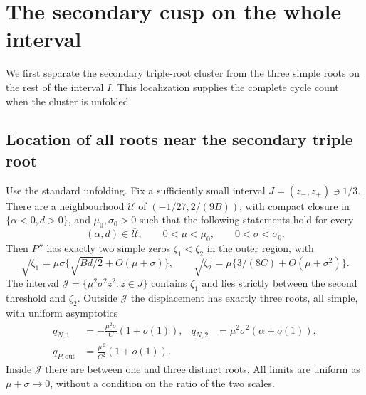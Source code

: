 \section{The secondary cusp on the whole interval}\label{sup:cusp}

We first separate the secondary triple-root cluster from the three simple
roots on the rest of the interval $I$. This localization supplies the
complete cycle count when the cluster is unfolded.

\subsection{Location of all roots near the secondary triple root}

\begin{lemma}
\label{corner:all-roots}
Use the standard unfolding.
Fix a sufficiently small interval $J=(z_-,z_+)\ni1/3$.
There are a neighbourhood $\mathcal U$ of
$(-1/27,2/(9B))$, with compact closure in $\{\alpha<0,d>0\}$,
and $\mu_0,\sigma_0>0$ such that the following statements hold for every
\[
 (\alpha,d)\in\overline{\mathcal U},\qquad
 0<\mu<\mu_0,\qquad 0<\sigma<\sigma_0.
\]
Then $P''$ has exactly two simple zeros $\zeta_1<\zeta_2$ in the outer region,
with
\begin{equation}\label{corner:independent-curvature-roots}
 \sqrt{\zeta_1}=\mu\sigma\{\sqrt{Bd/2}+O(\mu+\sigma)\},\qquad
 \sqrt{\zeta_2}=\mu\{3/(8C)+O(\mu+\sigma^2)\}.
\end{equation}
The interval $\mathcal J=\{\mu^2\sigma^2z^2:z\in J\}$ contains
$\zeta_1$ and lies strictly between the second threshold and $\zeta_2$.
Outside $\mathcal J$ the displacement has exactly three roots,
all simple, with uniform asymptotics
\begin{equation}\label{corner:cusp-companions}
\begin{aligned}
 q_{N,1}&=-\frac{\mu^2\sigma}{C}(1+o(1)),&
 q_{N,2}&=\mu^2\sigma^2(\alpha+o(1)),\\
 q_{P,\mathrm{out}}&=\frac{\mu^2}{C^2}(1+o(1)).
\end{aligned}
\end{equation}
Inside $\mathcal J$ there are between one and three distinct roots.
All limits are uniform as $\mu+\sigma\to0$, without a condition on
the ratio of the two scales.
\end{lemma}

